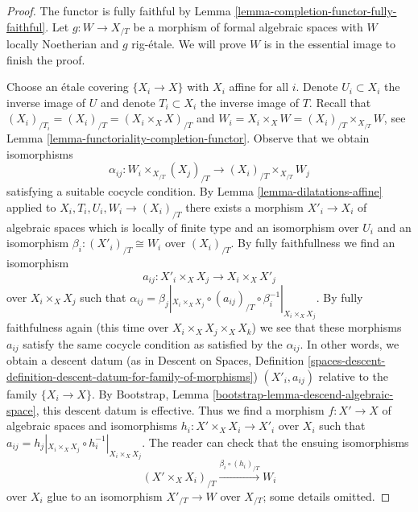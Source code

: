 \documentclass{stacks-project}
\theoremstyle{plain}
\theoremstyle{definition}
\theoremstyle{remark}
\numberwithin{equation}{subsection}
\begin{document}
\begin{proof}
The functor is fully faithful by
Lemma \ref{lemma-completion-functor-fully-faithful}.
Let $g : W \to X_{/T}$ be a morphism of formal algebraic spaces
with $W$ locally Noetherian and $g$ rig-\'etale.
We will prove $W$ is in the essential image to finish the proof.

\medskip\noindent
Choose an \'etale covering $\{X_i \to X\}$ with $X_i$ affine for all $i$.
Denote $U_i \subset X_i$ the inverse image of $U$ and denote
$T_i \subset X_i$ the inverse image of $T$.
Recall that $(X_i)_{/T_i} = (X_i)_{/T} = (X_i \times_X X)_{/T}$ and
$W_i = X_i \times_X W = (X_i)_{/T} \times_{X_{/T}} W$, see
Lemma \ref{lemma-functoriality-completion-functor}.
Observe that we obtain isomorphisms
$$
\alpha_{ij} :
W_i \times_{X_{/T}} (X_j)_{/T}
\longrightarrow 
(X_i)_{/T} \times_{X_{/T}} W_j
$$
satisfying a suitable cocycle condition.
By Lemma \ref{lemma-dilatations-affine} applied to
$X_i, T_i, U_i, W_i \to (X_i)_{/T}$
there exists a morphism $X'_i \to X_i$ of algebraic spaces
which is locally of finite type and an isomorphism over $U_i$
and an isomorphism $\beta_i : (X'_i)_{/T} \cong W_i$ over $(X_i)_{/T}$.
By fully faithfullness we find an isomorphism
$$
a_{ij} : X'_i \times_X X_j \longrightarrow X_i \times_X X'_j
$$
over $X_i \times_X X_j$ such that
$\alpha_{ij} = \beta_j|_{X_i \times_X X_j}
\circ (a_{ij})_{/T} \circ \beta_i^{-1}|_{X_i \times_X X_j}$.
By fully faithfulness again (this time over
$X_i \times_X X_j \times_X X_k$)
we see that these morphisms $a_{ij}$ satisfy the same
cocycle condition as satisfied by the $\alpha_{ij}$.
In other words, we obtain a descent datum
(as in Descent on Spaces, Definition
\ref{spaces-descent-definition-descent-datum-for-family-of-morphisms})
$(X'_i, a_{ij})$ relative to the family $\{X_i \to X\}$.
By Bootstrap, Lemma \ref{bootstrap-lemma-descend-algebraic-space},
this descent datum is effective. Thus we find a morphism
$f : X' \to X$ of algebraic spaces and isomorphisms
$h_i : X' \times_X X_i \to X'_i$ over $X_i$ such that
$a_{ij} = h_j|_{X_i \times_X X_j} \circ h_i^{-1}|_{X_i \times_X X_j}$.
The reader can check that the ensuing isomorphisms
$$
(X' \times_X X_i)_{/T}
\xrightarrow{\beta_i \circ (h_i)_{/T}}
W_i
$$
over $X_i$ glue to an isomorphism $X'_{/T} \to W$
over $X_{/T}$; some details omitted.
\end{proof}
\end{document}
